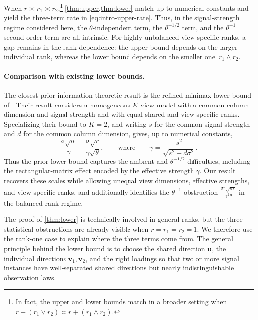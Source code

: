\documentclass[11pt]{article}
\begin{document}
When $r\asymp r_1\asymp r_2$,\footnote{In fact, the upper and lower bounds match in a broader setting when $r+(r_1\vee r_2)\asymp r+(r_1\wedge r_2)$.} \cref{thm:upper,thm:lower} match up to
numerical constants and yield the three-term rate in
\cref{eq:intro-upper-rate}.  Thus, in the signal-strength regime considered
here, the $\theta$-independent term, the $\theta^{-1/2}$ term, and the
$\theta^{-1}$ second-order term are all intrinsic.  For highly unbalanced
view-specific ranks, a gap remains in the rank dependence: the upper bound
depends on the larger individual rank, whereas the lower bound depends on
the smaller one~$r_1\wedge r_2$.


\paragraph{Comparison with existing lower bounds.}
The closest prior information-theoretic result is the refined minimax lower
bound of \citet[Theorem~5]{yang2025estimating}. Their result considers a
homogeneous $K$-view model with a common column dimension and signal strength and
with equal shared and view-specific ranks. Specializing their bound to $K=2$, and
writing $s$ for the common signal strength and $d$ for the common column dimension, gives, up to numerical constants,
\[
  \frac{\sigma\sqrt n}{\gamma}
  +
  \frac{\sigma\sqrt r}{\gamma\sqrt\theta},
  \qquad \text{where} \qquad
  \gamma
  =
  \frac{s^2}{\sqrt{s^2+d\sigma^2}}.
\]
Thus the prior lower bound captures the ambient and $\theta^{-1/2}$
difficulties, including the rectangular-matrix effect encoded by the effective
strength $\gamma$. Our result recovers these scales while allowing unequal
view dimensions, effective strengths, and view-specific ranks, and additionally
identifies the $\theta^{-1}$ obstruction
$
  \frac{\sigma^2\sqrt{nr}}{\gamma^2\theta}
$
in the balanced-rank regime. 







The proof of \cref{thm:lower} is technically involved in general ranks, but the three statistical obstructions are already visible when
$r=r_1=r_2=1$.  We therefore use the rank-one case to explain where the three terms come from.  
The general principle behind the lower bound is to choose the shared direction $\bm u$, the individual directions $\bm v_1,\bm v_2$, and the right loadings so that two or more signal instances have well-separated shared directions but nearly indistinguishable observation laws.  
\end{document}

